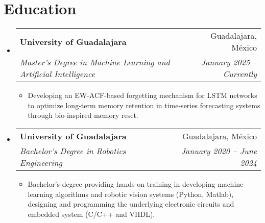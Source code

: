 \documentclass[a4paper,11pt]{article}
\makeatletter
\newcommand{\resumeItem}[1]{
  \item\small{
    {#1 \vspace{-2pt}}
  }
}
\newcommand{\resumeSubheading}[4]{
  \vspace{-2pt}\item
    \begin{tabular*}{1\textwidth}[t]{l@{\extracolsep{\fill}}r}
      \textbf{#1} & #2 \\
      \textit{\small#3} & \textit{\small #4} \\
    \end{tabular*}\vspace{-4pt}
}
\newcommand{\resumeSubHeadingListStart}{\begin{itemize}[leftmargin=0in, label={}]}
\newcommand{\resumeSubHeadingListEnd}{\end{itemize}}
\newcommand{\resumeItemListStart}{\begin{itemize}[leftmargin=0.15in, nosep]}
\newcommand{\resumeItemListEnd}{\end{itemize}\vspace{-2pt}}
\makeatother
\begin{document}
\section{\Large{Education}}
  \resumeSubHeadingListStart
    \resumeSubheading
      {University of Guadalajara}{Guadalajara, México}
      {Master's Degree in Machine Learning and Artificial Intelligence}{January 2025 -- Currently}
      \resumeItemListStart
        \resumeItem{Developing an EW-ACF-based forgetting mechanism for LSTM networks to optimize long-term memory retention in time-series forecasting systems through bio-inspired memory reset.}
      \resumeItemListEnd
    \resumeSubheading
      {University of Guadalajara}{Guadalajara, México}
      {Bachelor's Degree in Robotics Engineering}{January 2020 -- June 2024}
      \resumeItemListStart
        \resumeItem{Bachelor's degree providing hands-on training in developing machine learning algorithms and robotic vision systems (Python, Matlab), designing and programming the underlying electronic circuits and embedded system (C/C++ and VHDL).}
      \resumeItemListEnd
  \resumeSubHeadingListEnd
\vspace{-12pt}


\end{document}
